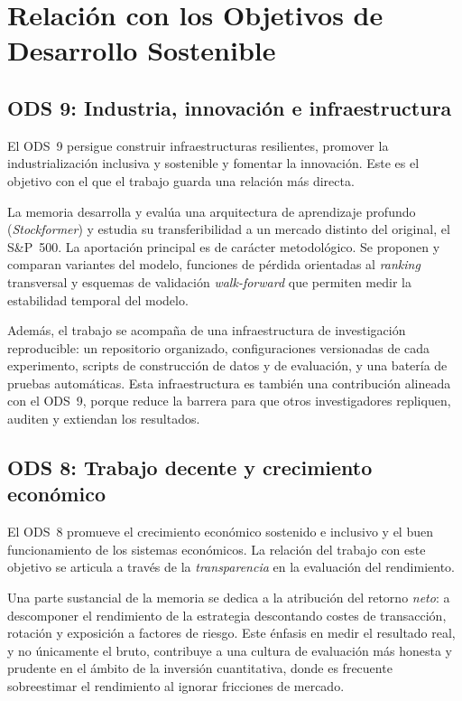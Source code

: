 \chapter{Relación con los Objetivos de Desarrollo Sostenible}\label{ap:ods}

\section{ODS 9: Industria, innovación e infraestructura}\label{sec:ods9}

El ODS~9 persigue construir infraestructuras resilientes, promover la industrialización
inclusiva y sostenible y fomentar la innovación. Este es el objetivo con el que el
trabajo guarda una relación más directa.

La memoria desarrolla y evalúa una arquitectura de aprendizaje profundo
(\emph{Stockformer}) y estudia su transferibilidad a un mercado distinto del original,
el S\&P~500. La aportación principal es de carácter metodológico.
Se proponen y comparan variantes del modelo, funciones de pérdida orientadas al
\emph{ranking} transversal y esquemas de validación \emph{walk-forward} que permiten
medir la estabilidad temporal del modelo.

Además, el trabajo se acompaña de una infraestructura de investigación reproducible:
un repositorio organizado, configuraciones versionadas de cada experimento, scripts de
construcción de datos y de evaluación, y una batería de pruebas automáticas. Esta
infraestructura es también una contribución alineada con el ODS~9, porque reduce
la barrera para que otros investigadores repliquen, auditen y extiendan los resultados.

\section{ODS 8: Trabajo decente y crecimiento económico}\label{sec:ods8}

El ODS~8 promueve el crecimiento económico sostenido e inclusivo y el buen
funcionamiento de los sistemas económicos. La relación del trabajo con este objetivo se
articula a través de la \emph{transparencia} en la evaluación del rendimiento.

Una parte sustancial de la memoria se dedica a la atribución del retorno \emph{neto}: a
descomponer el rendimiento de la estrategia descontando costes de transacción,
rotación y exposición a factores de riesgo. Este énfasis en medir el resultado real,
y no únicamente el bruto, contribuye a una cultura de evaluación más honesta y prudente
en el ámbito de la inversión cuantitativa, donde es frecuente sobreestimar el
rendimiento al ignorar fricciones de mercado.

